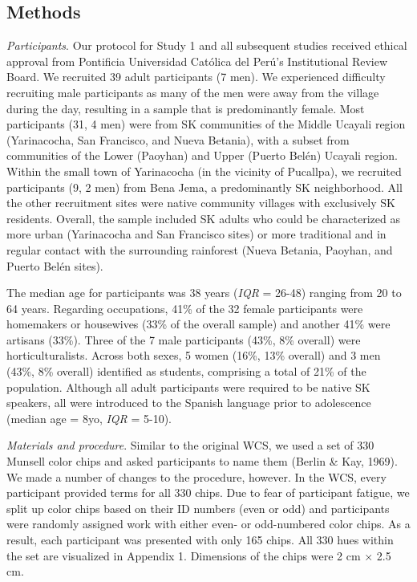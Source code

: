 \documentclass[
  english,
  ,man,floatsintext]{apa6}
\begin{document}
\hypertarget{methods}{%
\subsection{Methods}\label{methods}}

\emph{Participants}. Our protocol for Study 1 and all subsequent studies received ethical approval from Pontificia Universidad Católica del Perú's Institutional Review Board. We recruited 39 adult participants (7 men). We experienced difficulty recruiting male participants as many of the men were away from the village during the day, resulting in a sample that is predominantly female. Most participants (31, 4 men) were from SK communities of the Middle Ucayali region (Yarinacocha, San Francisco, and Nueva Betania), with a subset from communities of the Lower (Paoyhan) and Upper (Puerto Belén) Ucayali region. Within the small town of Yarinacocha (in the vicinity of Pucallpa), we recruited participants (9, 2 men) from Bena Jema, a predominantly SK neighborhood. All the other recruitment sites were native community villages with exclusively SK residents. Overall, the sample included SK adults who could be characterized as more urban (Yarinacocha and San Francisco sites) or more traditional and in regular contact with the surrounding rainforest (Nueva Betania, Paoyhan, and Puerto Belén sites).

The median age for participants was 38 years (\emph{IQR} = 26-48) ranging from 20 to 64 years. Regarding occupations, 41\% of the 32 female participants were homemakers or housewives (33\% of the overall sample) and another 41\% were artisans (33\%). Three of the 7 male participants (43\%, 8\% overall) were horticulturalists. Across both sexes, 5 women (16\%, 13\% overall) and 3 men (43\%, 8\% overall) identified as students, comprising a total of 21\% of the population. Although all adult participants were required to be native SK speakers, all were introduced to the Spanish language prior to adolescence (median age = 8yo, \emph{IQR} = 5-10).

\emph{Materials and procedure}. Similar to the original WCS, we used a set of 330 Munsell color chips and asked participants to name them (Berlin \& Kay, 1969). We made a number of changes to the procedure, however. In the WCS, every participant provided terms for all 330 chips. Due to fear of participant fatigue, we split up color chips based on their ID numbers (even or odd) and participants were randomly assigned work with either even- or odd-numbered color chips. As a result, each participant was presented with only 165 chips. All 330 hues within the set are visualized in Appendix 1. Dimensions of the chips were 2 cm × 2.5 cm.
\end{document}
